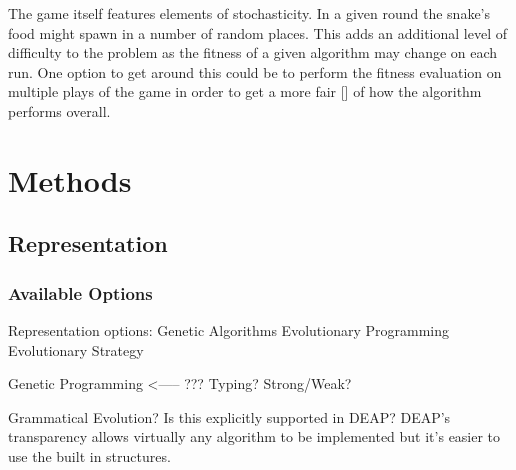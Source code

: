 \documentclass{article}
\begin{document}

The game itself features elements of stochasticity. In a given round the snake's food might spawn in a number of random places. This adds an additional level of difficulty to the problem as the fitness of a given algorithm may change on each run. One option to get around this could be to perform the fitness evaluation on multiple plays of the game in order to get a more fair [] of how the algorithm performs overall.

\section{Methods} %

\subsection{Representation}
\subsubsection{Available Options}


Representation options:
Genetic Algorithms
Evolutionary Programming
Evolutionary Strategy

Genetic Programming <----- ???
Typing? Strong/Weak?

Grammatical Evolution? Is this explicitly supported in DEAP?
DEAP's transparency allows virtually any algorithm to be implemented but it's easier to use the built in structures.
\end{document}
